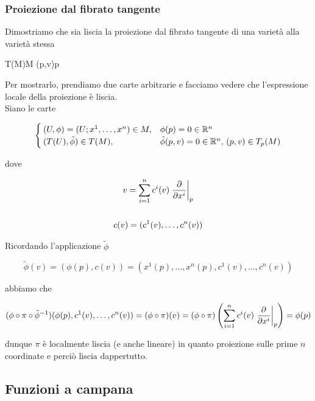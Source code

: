 \subsubsection{Proiezione dal fibrato tangente}

Dimostriamo che sia liscia la proiezione dal fibrato tangente di una varietà alla varietà stessa

\map{\pi}
	{T(M)}{M}
	{(p,v)}{p}

Per mostrarlo, prendiamo due carte arbitrarie e facciamo vedere che l'espressione locale della proiezione è liscia.\\
Siano le carte

\begin{equation}
	\begin{cases}
		(U,\phi) = (U; x^{1},\dots,x^{n}) \in M, & \phi(p) = 0 \in \mathbb{R}^{n} \\
		(T(U),\tilde{\phi}) \in T(M), & \tilde{\phi}(p,v) = 0 \in \mathbb{R}^{n}, \, (p,v) \in T_{p}(M)
	\end{cases}
\end{equation}

dove

\begin{gather}
	v = \displaystyle \sum_{i=1}^{n} c^{i}(v) \eval{ \pdv{x^{i}} }_{p} \\
	\nonumber \\
	c(v) = (c^{1}(v),\dots,c^{n}(v))
\end{gather}

Ricordando l'applicazione $ \tilde{\phi} $

\begin{equation}
	\tilde{\phi}(v) = (\phi(p),c(v)) = (x^{1}(p),\dots,x^{n}(p),c^{1}(v),\dots,c^{n}(v))
\end{equation}

abbiamo che

\begin{equation}
	(\phi \circ \pi \circ \tilde{\phi}^{-1}) (\phi(p),c^{1}(v),\dots,c^{n}(v)) = (\phi \circ \pi)(v) = (\phi \circ \pi) \left( \sum_{i=1}^{n} c^{i}(v) \eval{ \pdv{x^{i}} }_{p} \right) = \phi(p)
\end{equation}

dunque $ \pi $ è localmente liscia (e anche lineare) in quanto proiezione sulle prime $ n $ coordinate e perciò liscia dappertutto.

\subsection{Funzioni a campana}

